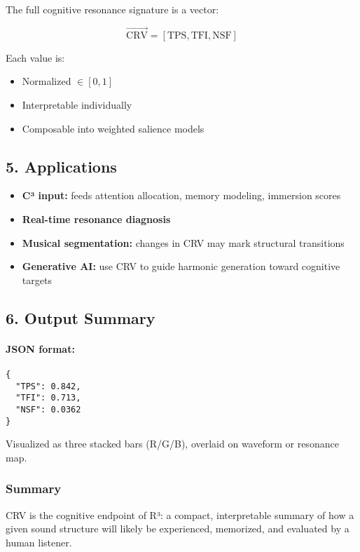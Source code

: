 The full cognitive resonance signature is a vector:

\[
\vec{\text{CRV}} = [\text{TPS}, \text{TFI}, \text{NSF}]
\]

Each value is:

\begin{itemize}
    \item Normalized $\in [0, 1]$
    \item Interpretable individually
    \item Composable into weighted salience models
\end{itemize}

\subsection*{5. Applications}

\begin{itemize}
    \item \textbf{C³ input:} feeds attention allocation, memory modeling, immersion scores
    \item \textbf{Real-time resonance diagnosis}
    \item \textbf{Musical segmentation:} changes in CRV may mark structural transitions
    \item \textbf{Generative AI:} use CRV to guide harmonic generation toward cognitive targets
\end{itemize}

\subsection*{6. Output Summary}

\paragraph{JSON format:}
\begin{verbatim}
{
  "TPS": 0.842,
  "TFI": 0.713,
  "NSF": 0.0362
}
\end{verbatim}

Visualized as three stacked bars (R/G/B), overlaid on waveform or resonance map.

\subsubsection*{Summary}

CRV is the cognitive endpoint of R³: a compact, interpretable summary of how a given sound structure will likely be experienced, memorized, and evaluated by a human listener.

